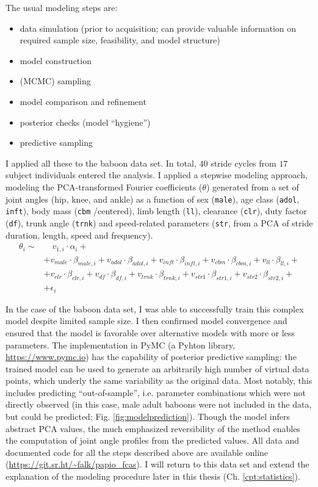 The usual modeling steps are:
\begin{itemize}
\item data simulation (prior to acquisition; can provide valuable information on required sample size, feasibility, and model structure)
\item model construction
\item (MCMC) sampling
\item model comparison and refinement
\item posterior checks (model ``hygiene'')
\item predictive sampling
\end{itemize}


I applied all these to the baboon data set.
In total, \(40\) stride cycles from \(17\) subject individuals entered the analysis.
I applied a stepwise modeling approach, modeling the PCA-transformed Fourier coefficients (\(\theta\)) generated from a set of joint angles (hip, knee, and ankle) as a function of sex (\texttt{male}), age class (\texttt{adol}, \texttt{inft}), body mass (\texttt{cbm} /centered), limb length (\texttt{ll}), clearance (\texttt{clr}), duty factor (\texttt{df}), trunk angle (\texttt{trnk}) and speed-related parameters (\texttt{str}, from a PCA of stride duration, length, speed and frequency).
\begin{equation}
\begin{split}
 \theta_{i}  \sim &\quad v_{1,i}\cdot\alpha_{i} +
\\ & + v_{male}\cdot\beta_{male,i} + v_{adol}\cdot\beta_{adol,i} + v_{inft}\cdot\beta_{inft,i} + v_{cbm}\cdot\beta_{cbm,i}+ v_{ll}\cdot\beta_{ll,i} +
\\ & + v_{clr}\cdot\beta_{clr,i} + v_{df}\cdot\beta_{df,i} + v_{trnk}\cdot\beta_{trnk,i} + v_{str1}\cdot\beta_{str1,i} + v_{str2}\cdot\beta_{str2,i} +
\\ & + \epsilon_{i}
\end{split}
 \label{eq:jap}
\end{equation}


In the case of the baboon data set, I was able to successfully train this complex model despite limited sample size.
I then confirmed model convergence and ensured that the model is favorable over alternative models with more or less parameters.
The implementation in PyMC (a Pyhton library, \url{https://www.pymc.io}) has the capability of posterior predictive sampling: the trained model can be used to generate an arbitrarily high number of virtual data points, which underly the same variability as the original data.
Most notably, this includes predicting ``out-of-sample'', i.e. parameter combinations which were not directly observed (in this case, male adult baboons were not included in the data, but could be predicted; Fig. \ref{fig:modelprediction}).
Though the model infers abstract PCA values, the much emphasized reversibility of the method enables the computation of joint angle profiles from the predicted values.
All data and documented code for all the steps described above are available online (\url{https://git.sr.ht/\~falk/papio\_fcas}).
I will return to this data set and extend the explanation of the modeling procedure later in this thesis (Ch. \ref{cpt:statistics}).


